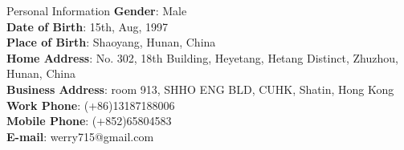 
\begin{rSection}{Personal Information}
    \textbf{Gender}: Male \\ \textbf{Date of Birth}: 15th, Aug, 1997 \\ 
    \textbf{Place of Birth}: Shaoyang, Hunan, China \\ 
    \textbf{Home Address}: No. 302, 18th Building, Heyetang, Hetang Distinct, Zhuzhou, Hunan, China\\
    \textbf{Business Address}: room 913, SHHO ENG BLD, CUHK, Shatin, Hong Kong\\
    \textbf{Work Phone}: (+86)13187188006\\ 
    \textbf{Mobile Phone}: (+852)65804583\\ 
    \textbf{E-mail}: werry715@gmail.com
\end{rSection}
    




